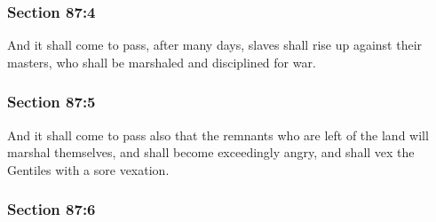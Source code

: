 
	\subsubsection{Section 87:4} %
		\label{DC87-4}

		And it shall come to pass, after many days, slaves shall rise up against their masters, who shall be marshaled and disciplined for war.


	\subsubsection{Section 87:5} %
		\label{DC87-5}

		And it shall come to pass also that the remnants who are left of the land will marshal themselves, and shall become exceedingly angry, and shall vex the Gentiles with a sore vexation.


	\subsubsection{Section 87:6} %
		\label{DC87-6}

